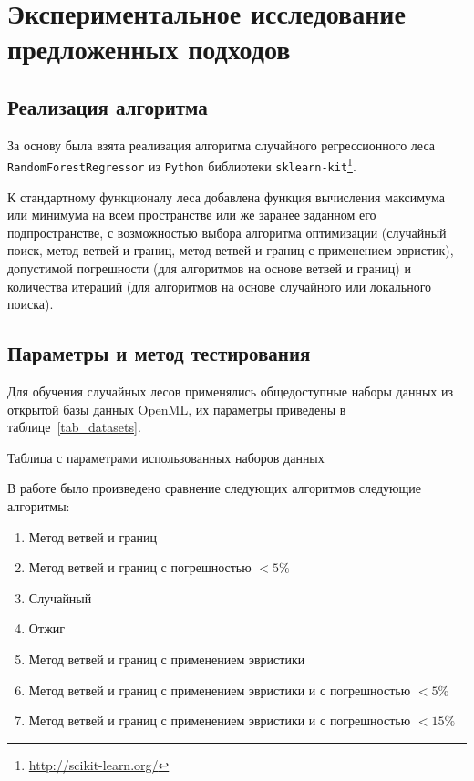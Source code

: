 \chapter{Экспериментальное исследование предложенных подходов}\label{chap:third}

\section{Реализация алгоритма}\label{sec:impl}

За основу была взята реализация алгоритма случайного регрессионного леса
\texttt{RandomForestRegressor} из \texttt{Python} библиотеки
\texttt{sklearn-kit}\footnote{\url{http://scikit-learn.org/}}. 

К стандартному функционалу леса добавлена функция вычисления максимума или
минимума на всем пространстве или же заранее заданном его подпространстве,
с возможностью выбора алгоритма оптимизации (случайный поиск, метод ветвей
и границ, метод ветвей и границ с применением эвристик), допустимой погрешности
(для алгоритмов на основе ветвей и границ) и количества итераций (для алгоритмов
на основе случайного или локального поиска). 

\section{Параметры и метод тестирования}\label{sec:test}

Для обучения случайных лесов применялись общедоступные наборы данных из открытой
базы данных OpenML, их параметры приведены в таблице~\ref{tab_datasets}.

\begin{center}
    \begin{table}[H]
    \caption{Таблица с параметрами использованных наборов данных}\label{tab_datasets}
        
    \end{table}
\end{center}

В работе было произведено сравнение следующих алгоритмов следующие алгоритмы: 

\begin{enumerate}
        \item Метод ветвей и границ 
        \item Метод ветвей и границ с погрешностью $<5\%$
        \item Случайный
        \item Отжиг
        \item Метод ветвей и границ с применением эвристики
        \item Метод ветвей и границ с применением эвристики и с погрешностью $<5\%$
        \item Метод ветвей и границ с применением эвристики и с погрешностью $<15\%$
\end{enumerate}

